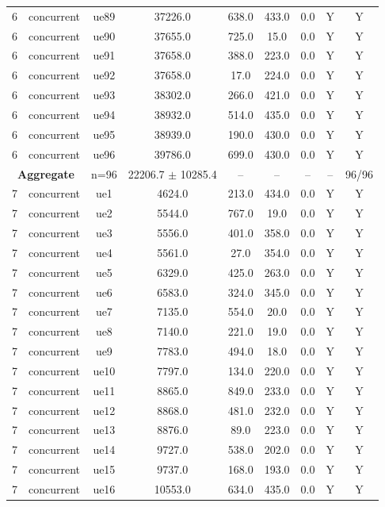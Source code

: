 \begin{table}[ht]
\begin{tabular}{|c|c|c|c|c|c|c|c|c|}
6 & concurrent & ue89 & 37226.0 & 638.0 & 433.0 & 0.0 & Y & Y \\
6 & concurrent & ue90 & 37655.0 & 725.0 & 15.0 & 0.0 & Y & Y \\
6 & concurrent & ue91 & 37658.0 & 388.0 & 223.0 & 0.0 & Y & Y \\
6 & concurrent & ue92 & 37658.0 & 17.0 & 224.0 & 0.0 & Y & Y \\
6 & concurrent & ue93 & 38302.0 & 266.0 & 421.0 & 0.0 & Y & Y \\
6 & concurrent & ue94 & 38932.0 & 514.0 & 435.0 & 0.0 & Y & Y \\
6 & concurrent & ue95 & 38939.0 & 190.0 & 430.0 & 0.0 & Y & Y \\
6 & concurrent & ue96 & 39786.0 & 699.0 & 430.0 & 0.0 & Y & Y \\
\multicolumn{2}{|c|}{\textbf{Aggregate}} & n=96 & 22206.7 $\pm$ 10285.4 & -- & -- & -- & -- & 96/96 \\
\hline
7 & concurrent & ue1 & 4624.0 & 213.0 & 434.0 & 0.0 & Y & Y \\
7 & concurrent & ue2 & 5544.0 & 767.0 & 19.0 & 0.0 & Y & Y \\
7 & concurrent & ue3 & 5556.0 & 401.0 & 358.0 & 0.0 & Y & Y \\
7 & concurrent & ue4 & 5561.0 & 27.0 & 354.0 & 0.0 & Y & Y \\
7 & concurrent & ue5 & 6329.0 & 425.0 & 263.0 & 0.0 & Y & Y \\
7 & concurrent & ue6 & 6583.0 & 324.0 & 345.0 & 0.0 & Y & Y \\
7 & concurrent & ue7 & 7135.0 & 554.0 & 20.0 & 0.0 & Y & Y \\
7 & concurrent & ue8 & 7140.0 & 221.0 & 19.0 & 0.0 & Y & Y \\
7 & concurrent & ue9 & 7783.0 & 494.0 & 18.0 & 0.0 & Y & Y \\
7 & concurrent & ue10 & 7797.0 & 134.0 & 220.0 & 0.0 & Y & Y \\
7 & concurrent & ue11 & 8865.0 & 849.0 & 233.0 & 0.0 & Y & Y \\
7 & concurrent & ue12 & 8868.0 & 481.0 & 232.0 & 0.0 & Y & Y \\
7 & concurrent & ue13 & 8876.0 & 89.0 & 223.0 & 0.0 & Y & Y \\
7 & concurrent & ue14 & 9727.0 & 538.0 & 202.0 & 0.0 & Y & Y \\
7 & concurrent & ue15 & 9737.0 & 168.0 & 193.0 & 0.0 & Y & Y \\
7 & concurrent & ue16 & 10553.0 & 634.0 & 435.0 & 0.0 & Y & Y \\

\end{tabular}
\end{table}
